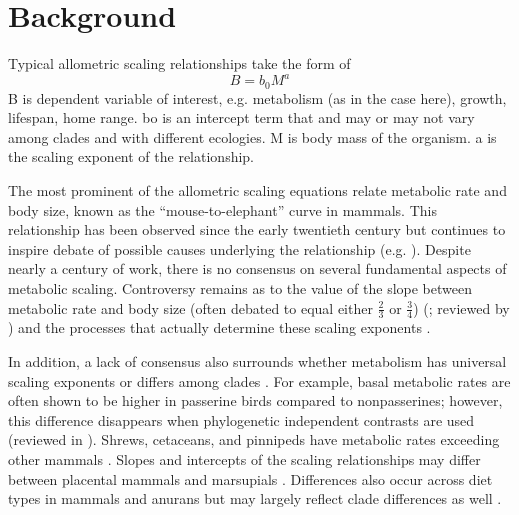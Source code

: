 \documentclass[10pt, a4paper]{article}
\begin{document}
\section*{Background}
Typical allometric scaling relationships take the form of 
\[B = b_0M^a\]
B is dependent variable of interest, e.g. metabolism (as in the case here), growth, lifespan, home range. bo is an intercept term that and may or may not vary among clades and with different ecologies.  M is body mass of the organism. a is the scaling exponent of the relationship. \

The most prominent of the allometric scaling equations relate metabolic rate and body size, known as the “mouse-to-elephant” curve in mammals.  This relationship has been observed since the early twentieth century \cite{Benedict1938} but continues to inspire debate of possible causes underlying the relationship (e.g. \cite{West1999a, West1999b, Bokma2004}). Despite nearly a century of work, there is no consensus on several fundamental aspects of metabolic scaling. Controversy remains as to the value of the slope between metabolic rate and body size (often debated to equal either $\frac{2}{3}$ or $\frac{3}{4}$) (\cite{West1997, West1999a, West1999b, Brown2004, Savage2004, FarrellGray2005, IsaacCarbone2010, WhiteSeymour2003, Hudson2013, Dodds2001}; reviewed by \cite{Bokma2004, IsaacCarbone2010}) and the processes that actually determine these scaling exponents \cite{West1999a, West1999b, Banavar2002, Brown2004, CyrWalker2004, Glazier2005, Kolokotrones2010, Apol2008, Banavar2010, Maino2013}. \

In addition, a lack of consensus also surrounds whether metabolism has universal scaling exponents or differs among clades  \cite{HayssenLacy1985, McKechnieWolf2004, Glazier2005, McKechnie2006, White2006, Makarieva2008, Sieg2009, Capellini2010, DeLong2010}. For example, basal metabolic rates are often shown to be higher in passerine birds compared to nonpasserines; however, this difference disappears when phylogenetic independent contrasts are used (reviewed in \cite{McKechnieWolf2004}). Shrews, cetaceans, and pinnipeds have metabolic rates exceeding other mammals \cite{Bartels1982, Andersen1969}. Slopes and intercepts of the scaling relationships may differ between placental mammals and marsupials \cite{McNab1988, AgutterWheatley2004}.  Differences also occur across diet types in mammals \cite{McNab1988} and anurans \cite{SantosCannatella2011} but may largely reflect clade differences as well \cite{ElgarHarvey1987}.  \
\end{document}
